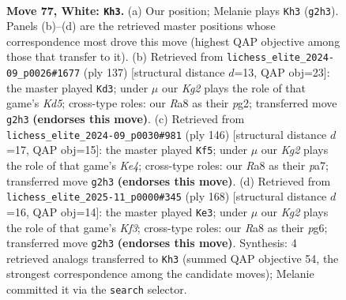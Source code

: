 \documentclass[11pt]{article}
\begin{document}
\clearpage

\begin{figure}[p]\centering
\begin{subfigure}{0.46\textwidth}\centering
\resizebox{\linewidth}{!}{%
\newchessgame
\chessboard[
  setfen={R7/4rp2/2R1p3/6k1/P3P3/5P2/6K1/8 w - - 45 77},
  showmover=false,
  pgfstyle=straightmove, color=movearrow, markmove={g2-h3}
]}
\caption{}
\end{subfigure}\hfill
\begin{subfigure}{0.46\textwidth}\centering
\resizebox{\linewidth}{!}{%
\newchessgame
\chessboard[
  setfen={3R4/1r1P4/1p6/1P4p1/3kp3/8/5KP1/8 b - - 1 69},
  showmover=false,
  pgfstyle=straightmove, color=movearrow, markmove={d4-d3}
]}
\caption{}
\end{subfigure}
\\[4pt]
\begin{subfigure}{0.46\textwidth}\centering
\resizebox{\linewidth}{!}{%
\newchessgame
\chessboard[
  setfen={8/p5k1/8/4P2p/4KP2/r6p/P1R5/8 w - - 2 74},
  showmover=false,
  pgfstyle=straightmove, color=movearrow, markmove={e4-f5}
]}
\caption{}
\end{subfigure}\hfill
\begin{subfigure}{0.46\textwidth}\centering
\resizebox{\linewidth}{!}{%
\newchessgame
\chessboard[
  setfen={8/8/r5p1/4k2p/7P/5KP1/p7/R7 w - - 8 85},
  showmover=false,
  pgfstyle=straightmove, color=movearrow, markmove={f3-e3}
]}
\caption{}
\end{subfigure}
\caption{\textbf{Move 77, White: \texttt{Kh3}.} (a) Our position; Melanie plays \texttt{Kh3} (\texttt{g2h3}). Panels (b)--(d) are the retrieved master positions whose correspondence most drove this move (highest QAP objective among those that transfer to it). (b) Retrieved from \texttt{lichess\_elite\_2024-09\_p0026\#1677} (ply 137) [structural distance $d$=13, QAP obj=23]: the master played \texttt{Kd3}; under $\mu$ our \emph{Kg2} plays the role of that game's \emph{Kd5}; cross-type roles: our \emph{R}a8 as their \emph{p}g2; transferred move \texttt{g2h3} \textbf{(endorses this move)}. (c) Retrieved from \texttt{lichess\_elite\_2024-09\_p0030\#981} (ply 146) [structural distance $d$=17, QAP obj=15]: the master played \texttt{Kf5}; under $\mu$ our \emph{Kg2} plays the role of that game's \emph{Ke4}; cross-type roles: our \emph{R}a8 as their \emph{p}a7; transferred move \texttt{g2h3} \textbf{(endorses this move)}. (d) Retrieved from \texttt{lichess\_elite\_2025-11\_p0000\#345} (ply 168) [structural distance $d$=16, QAP obj=14]: the master played \texttt{Ke3}; under $\mu$ our \emph{Kg2} plays the role of that game's \emph{Kf3}; cross-type roles: our \emph{R}a8 as their \emph{p}g6; transferred move \texttt{g2h3} \textbf{(endorses this move)}. Synthesis: 4 retrieved analogs transferred to \texttt{Kh3} (summed QAP objective 54, the strongest correspondence among the candidate moves); Melanie committed it via the \texttt{search} selector.}
\label{fig:thought-m152}
\end{figure}
\end{document}
